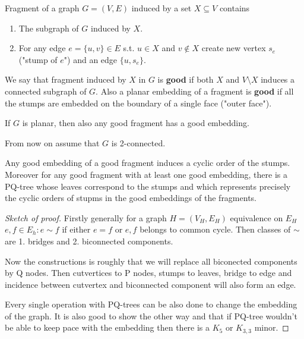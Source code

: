 \begin{defn}
	Fragment of a graph $G = (V,E)$ induced by a set $X \subseteq V$ contains

	\begin{enumerate}
			\item The subgraph of $G$ induced by $X$.
			\item For any edge $e = \{u,v\} \in E$ s.t. $u \in X$ and $v \notin X$ create new vertex $s_{e}$ ("stump of $e$") and an edge $\{u, s_{e}\}$.
	\end{enumerate}
\end{defn}

We say that fragment induced by $X$ in $G$ is \textbf{good} if both $X$ and $V \setminus X$ induces a connected subgraph of $G$. Also a planar embedding of a fragment is \textbf{good} if all the stumps are embedded on the boundary of a single face ("outer face").

\begin{observ}
	If $G$ is planar, then also any good fragment has a good embedding.
\end{observ}

From now on assume that $G$ is 2-connected.

\begin{fact}
	Any good embedding of a good fragment induces a cyclic order of the stumps. Moreover for any good fragment with at least one good embedding, there is a PQ-tree whose leaves correspond to the stumps and which represents precisely the cyclic orders of stupms in the good embeddings of the fragments.
\end{fact}

\begin{proof}[Sketch of proof]
	Firstly generally for a graph $H = (V_{H}, E_{H})$ equivalence on $E_{H}$ $e,f \in E_{h}: e \sim f$ if either $e = f$ or $e, f$ belongs to common cycle. Then classes of $\sim$ are 1. bridges and 2. biconnected components.

	Now the constructions is roughly that we will replace all biconected components by Q nodes. Then cutvertices to P nodes, stumps to leaves, bridge to edge and incidence between cutvertex and biconnected component will also form an edge.

	Every single operation with PQ-trees can be also done to change the embedding of the graph. It is also good to show the other way and that if PQ-tree wouldn't be able to keep pace with the embedding then there is a $K_{5}$ or $K_{3,3}$ minor.
\end{proof}

